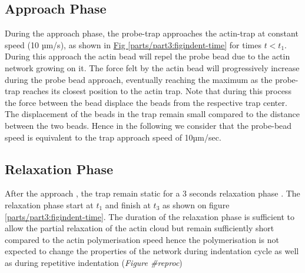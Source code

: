 \documentclass[A4paperpaper,11pt,english]{sphinxmanual}
\begin{document}
\subsection{Approach Phase}
\label{parts/part3:approach-phase}
During the approach phase, the probe-trap approaches the actin-trap at constant speed (10 µm/s), as shown in
\hyperref[parts/part3:figindent-time]{Fig  \ref*{parts/part3:figindent-time}} for times \(t < t_1\). During this approach the actin bead
will repel the probe bead due to the actin network growing on it. The force felt
by the actin bead will progressively increase during the probe bead approach,
eventually reaching the maximum as the probe-trap reaches its closest position
to the actin trap. Note that during this process
the force between the bead displace the beads from the respective trap center.
The displacement of the beads in the trap remain small compared to the
distance between the two beads. Hence in the following we consider that the probe-bead speed is equivalent to the trap approach speed of 10µm/sec.


\subsection{Relaxation Phase}
\label{parts/part3:relaxation-phase}
After the approach , the trap remain static for a 3 seconds relaxation phase
. The relaxation phase start at \(t_1\) and
finish at \(t_3\) as shown on figure \hyperref[parts/part3:figindent-time]{ \ref*{parts/part3:figindent-time}}. The duration of the relaxation phase is sufficient to allow the partial
relaxation of the actin cloud  but remain sufficiently short compared to
the actin polymerisation speed hence the polymerisation is not expected to
change the properties of the network during indentation cycle as well as
during repetitive indentation (\emph{Figure \#reproc})
\end{document}
